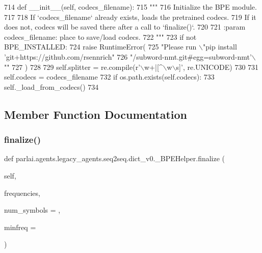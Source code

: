 \begin{DoxyCode}
714     \textcolor{keyword}{def }\_\_init\_\_(self, codecs\_filename):
715         \textcolor{stringliteral}{"""}
716 \textcolor{stringliteral}{        Initialize the BPE module.}
717 \textcolor{stringliteral}{}
718 \textcolor{stringliteral}{        If `codecs\_filename` already exists, loads the pretrained codecs.}
719 \textcolor{stringliteral}{        If it does not, codecs will be saved there after a call to `finalize()`.}
720 \textcolor{stringliteral}{}
721 \textcolor{stringliteral}{        :param codecs\_filename: place to save/load codecs.}
722 \textcolor{stringliteral}{        """}
723         \textcolor{keywordflow}{if} \textcolor{keywordflow}{not} BPE\_INSTALLED:
724             \textcolor{keywordflow}{raise} RuntimeError(
725                 \textcolor{stringliteral}{"Please run \(\backslash\)"pip install 'git+https://github.com/rsennrich"}
726                 \textcolor{stringliteral}{"/subword-nmt.git#egg=subword-nmt'\(\backslash\)""}
727             )
728 
729         self.splitter = re.compile(\textcolor{stringliteral}{r'\(\backslash\)w+|[^\(\backslash\)w\(\backslash\)s]'}, re.UNICODE)
730 
731         self.codecs = codecs\_filename
732         \textcolor{keywordflow}{if} os.path.exists(self.codecs):
733             self.\_load\_from\_codecs()
734 
\end{DoxyCode}


\subsection{Member Function Documentation}
\mbox{\label{classparlai_1_1agents_1_1legacy__agents_1_1seq2seq_1_1dict__v0_1_1__BPEHelper_a9a5b899a899872f36079d4a7b9dc8ae4}} 
\subsubsection{\texorpdfstring{finalize()}{finalize()}}
{\footnotesize\ttfamily def parlai.\+agents.\+legacy\+\_\+agents.\+seq2seq.\+dict\+\_\+v0.\+\_\+\+B\+P\+E\+Helper.\+finalize (\begin{DoxyParamCaption}\item[{}]{self,  }\item[{}]{frequencies,  }\item[{}]{num\+\_\+symbols = {},  }\item[{}]{minfreq = {} }\end{DoxyParamCaption})}

